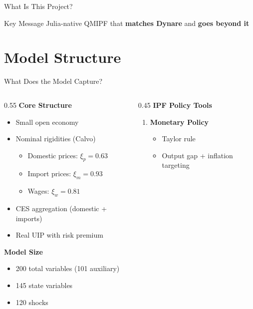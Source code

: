 \documentclass[aspectratio=169,12pt]{beamer}
\begin{document}
\begin{frame}{What Is This Project?}
\vspace{0.3cm}
\begin{block}{Key Message}
Julia-native QMIPF that \textbf{matches Dynare} and \textbf{goes beyond it}
\end{block}

\end{frame}

\section{Model Structure}

\begin{frame}{What Does the Model Capture?}

\begin{columns}[T]
\begin{column}{0.55\textwidth}
\textbf{Core Structure}
\begin{itemize}
\item Small open economy
\item Nominal rigidities (Calvo)
\begin{itemize}
\item Domestic prices: $\xi_p = 0.63$
\item Import prices: $\xi_m = 0.93$
\item Wages: $\xi_w = 0.81$
\end{itemize}
\item CES aggregation (domestic + imports)
\item Real UIP with risk premium
\end{itemize}

\vspace{0.3cm}
\textbf{Model Size}
\begin{itemize}
\item 200 total variables (101 auxiliary)
\item 145 state variables
\item 120 shocks
\end{itemize}
\end{column}

\begin{column}{0.45\textwidth}
\textbf{IPF Policy Tools}

\vspace{0.2cm}
\begin{enumerate}
\item \textbf{Monetary Policy}
\begin{itemize}
\item Taylor rule
\item Output gap + inflation targeting
\end{itemize}


\end{enumerate}
\end{column}
\end{columns}
\end{frame}
\end{document}

